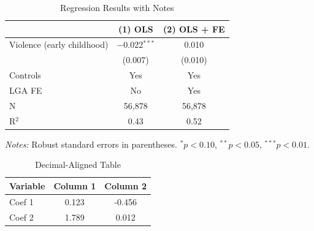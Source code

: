 \begin{table}[H]
    \centering
    \caption{Regression Results with Notes}
    \label{tab:with_notes}
    \begin{threeparttable}
        \begin{tabular}{lcc}
            \toprule
            & (1) OLS & (2) OLS + FE \\
            \midrule
            Violence (early childhood) & $-$0.022$^{***}$ & 0.010 \\
                                       & (0.007)          & (0.010) \\[0.3em]
            Controls & Yes & Yes \\
            LGA FE   & No  & Yes \\
            \midrule
            N        & 56,878 & 56,878 \\
            R$^2$    & 0.43   & 0.52   \\
            \bottomrule
        \end{tabular}
        \begin{tablenotes}
            \small
            \item \textit{Notes:} Robust standard errors in parentheses.
            $^{*}p < 0.10$, $^{**}p < 0.05$, $^{***}p < 0.01$.
        \end{tablenotes}
    \end{threeparttable}
\end{table}


\begin{table}[H]
    \centering
    \caption{Decimal-Aligned Table}
    \label{tab:siunitx}
    \begin{tabular}{l S[table-format=1.3] S[table-format=1.3]}
        \toprule
        Variable & {Column 1} & {Column 2} \\   %
        \midrule
        Coef 1   & 0.123 & -0.456 \\
        Coef 2   & 1.789 & 0.012  \\
        \bottomrule
    \end{tabular}
\end{table}


